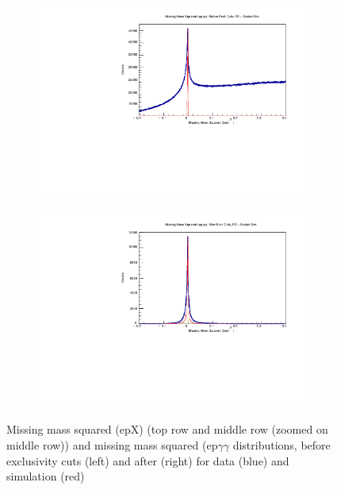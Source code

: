 \begin{figure}[!htb]
\begin{subfigure}{.45\textwidth}
                \includegraphics[width=1\textwidth]{figures/Simulation/exclusivity/hist_missing_mass_squared_epgg_prexcut_fd_Double.pdf}
            \end{subfigure}%
            \begin{subfigure}{.45\textwidth}
                \centering
                \includegraphics[width=1\textwidth]{figures/Simulation/exclusivity/hist_missing_mass_squared_epgg_excut_fd_Double.pdf}
            \end{subfigure}
            \caption[short]{Missing mass squared (epX) (top row and middle row (zoomed on middle row)) and missing mass squared (ep$\gamma \gamma$ distributions, before exclusivity cuts (left) and after (right) for data (blue) and simulation (red)}
        \label{fig:MM}
        \end{figure}

